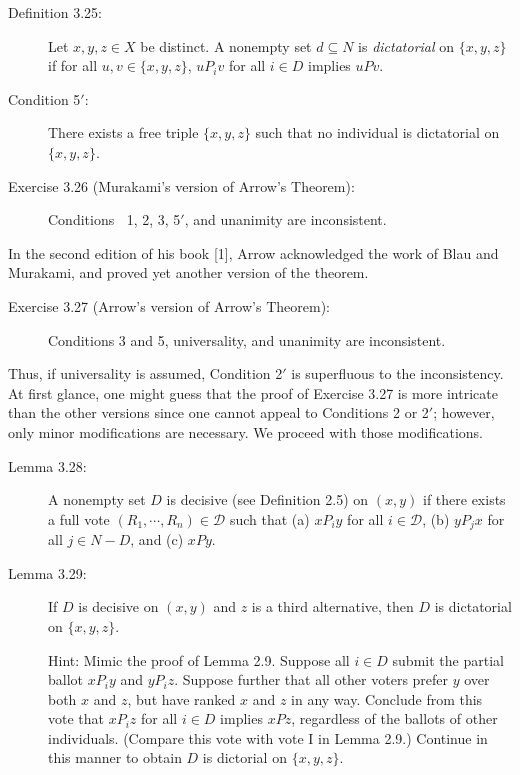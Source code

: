 \documentclass{article}
\begin{document}
\begin{description}

\item[Definition 3.25:] Let $x,y,z \in X$ be distinct. A nonempty set $d \subseteq N$ is \emph{dictatorial} on $\{ x,y,z \}$ if for all $u,v \in \{ x,y,z \}$, $uP_{i}v$ for all $i \in D$ implies $uPv$.

\item[Condition 5$'$:] There exists a free triple $\{ x,y,z \}$ such that no individual is dictatorial on $\{ x,y,z \}$.

\item[Exercise 3.26 (Murakami's version of Arrow's Theorem):] Conditions $\ $ 1, 2, 3, 5$'$, and unanimity are inconsistent.

\end{description}

In the second edition of his book [1], Arrow acknowledged the work of Blau and Murakami, and proved yet another version of the theorem.

\begin{description}

\item[Exercise 3.27 (Arrow's version of Arrow's Theorem):] Conditions 3 and 5, universality, and unanimity are inconsistent.

\end{description}

Thus, if universality is assumed, Condition 2$'$ is superfluous to the inconsistency. At first glance, one might guess that the proof of Exercise 3.27 is more intricate than the other versions since one cannot appeal to Conditions 2 or 2$'$; however, only minor modifications are necessary. We proceed with those modifications.

\begin{description}


\item[Lemma 3.28:] A nonempty set $D$ is decisive (see Definition 2.5) on $(x,y)$ if there exists a full vote $(R_{1},\cdots,R_{n}) \in \mathcal{D}$ such that (a) $xP_{i}y$ for all $i \in \mathcal{D}$, (b) $yP_{j}x$ for all $j \in N - D$, and (c) $xPy$.

\item[Lemma 3.29:] If $D$ is decisive on $(x,y)$ and $z$ is a third alternative, then $D$ is dictatorial on $\{ x,y,z \}$.

  Hint: Mimic the proof of Lemma 2.9. Suppose all $i \in D$ submit the partial ballot $xP_{i}y$ and $yP_{i}z$. Suppose further that all other voters prefer $y$ over both $x$ and $z$, but have ranked $x$ and $z$ in any way. Conclude from this vote that $xP_{i}z$ for all $i \in D$ implies $xPz$, regardless of the ballots of other individuals. (Compare this vote with vote I in Lemma 2.9.) Continue in this manner to obtain $D$ is dictorial on $\{ x,y,z \}$.

\end{description}
\end{document}
